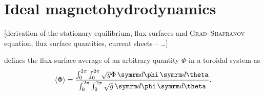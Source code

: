 \section{Ideal magnetohydrodynamics}

[derivation of the stationary equilibrium, flux surfaces and \textsc{Grad}--\textsc{Shafranov} equation, flux surface quantities, current sheets -- \cite{Waelbroeck09} \ldots]

\textcite{dHaeseleer91} defines the flux-surface average of an arbitrary quantity $\Phi$ in a toroidal system as
\begin{gather}
  \langle \Phi \rangle = \frac{\int_{0}^{2 \pi} \int_{0}^{2 \pi} \sqrt{g} \Phi \, \diff \phi \, \diff \theta}{\int_{0}^{2 \pi} \int_{0}^{2 \pi} \sqrt{g} \, \diff \phi \, \diff \theta}. \label{eq:flux_surface_avg}
\end{gather}



